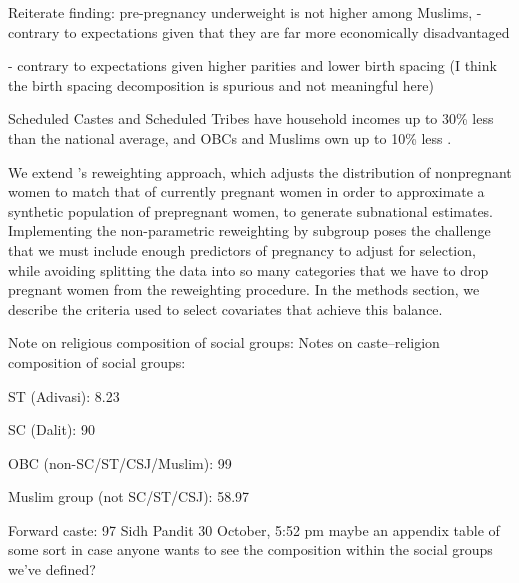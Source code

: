 Reiterate finding: pre-pregnancy underweight is not higher among Muslims,
- contrary to expectations given that they are far more economically disadvantaged

- contrary to expectations given higher parities and lower birth spacing (I think the birth spacing decomposition is spurious and not meaningful here)



Scheduled Castes and Scheduled Tribes have household incomes up to 30\% less than the national average, and OBCs and Muslims own up to 10\% less \citep{bharti2018wealth}.



We extend \cite{coffey2015prepregnancy}’s reweighting approach, which adjusts the distribution of nonpregnant women to match that of currently pregnant women in order to approximate a synthetic population of prepregnant women, to generate subnational estimates. Implementing the non-parametric reweighting by subgroup poses the challenge that we must include enough predictors of pregnancy to adjust for selection, while avoiding splitting the data into so many categories that we have to drop pregnant women from the reweighting procedure. In the methods section, we describe the criteria used to select covariates that achieve this balance.

Note on religious composition of social groups:
Notes on caste–religion composition of social groups:

ST (Adivasi): 8.23%

SC (Dalit): 90%

OBC (non-SC/ST/CSJ/Muslim): 99%

Muslim group (not SC/ST/CSJ): 58.97%

Forward caste: 97%
Sidh Pandit
30 October, 5:52 pm
maybe an appendix table of some sort in case anyone wants to see the composition within the social groups we've defined?